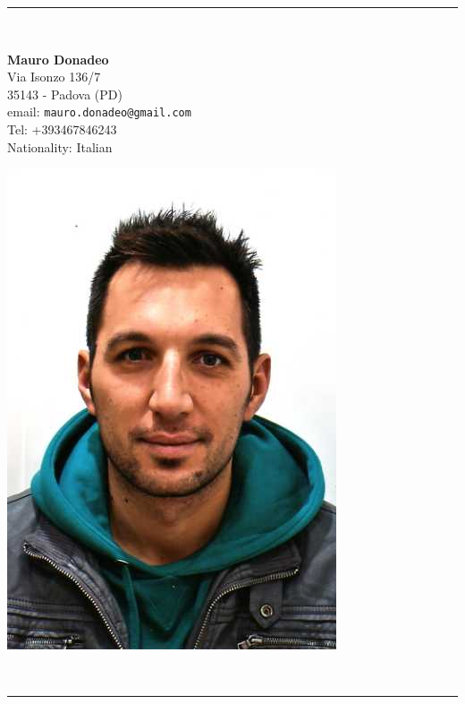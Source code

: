 \documentclass[pdftex,a4paper,12pt,twoside,titlepage,italian,openright]{article}
\begin{document}
\vspace*{.2cm}
\begin{center}
\rule{.8 \textwidth}{1pt}\\[5pt]
\begin{minipage}{.55\textwidth}
	\LARGE\textbf{Mauro Donadeo}\\[20pt]
	\footnotesize Via Isonzo 136/7 \\ 
	35143 - Padova (PD)\\
	email: \texttt{mauro.donadeo@gmail.com}\\
	\footnotesize Tel: +393467846243\\
	\footnotesize Nationality: Italian\\
\end{minipage}
\begin{minipage}{.25\textwidth}
	\includegraphics[width=\textwidth]{io.jpg}
\end{minipage}\\[5pt]
\rule{.8 \textwidth}{1pt}
\end{center}
\end{document}
